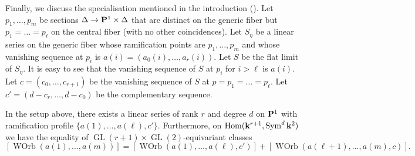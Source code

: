 \documentclass[11pt]{amsart}
\renewcommand {\P}{{\bf P}}
\providecommand{\GL}{\operatorname{GL}}
\providecommand{\Hom}{\operatorname{Hom}}
\providecommand{\Sym}{\operatorname{Sym}}
\DeclareMathOperator{\WOrb}{WOrb}
\begin{document}
Finally, we discuss the specialisation mentioned in the introduction ().
Let \(p_1, \dots, p_m\) be sections \(\Delta \to \P^1 \times \Delta\) that are distinct on the generic fiber but \(p_1 = \dots = p_\ell\) on the central fiber (with no other coincidences).
Let \(S_\eta\) be a linear series on the generic fiber whose ramification points are \(p_1, \dots, p_m\) and whose vanishing sequence at \(p_i\) is \(a(i) = (a_0(i),\dots,a_r(i))\).
Let \(S\) be the flat limit of \(S_\eta\).
It is easy to see that the vanishing sequence of \(S\) at \(p_i\) for \(i > \ell\) is \(a(i)\).
Let \(c = (c_0, \dots, c_{r+1})\) be the vanishing sequence of \(S\) at \(p = p_1 = \dots = p_\ell\).
Let \(c' = (d-c_r, \dots, d-c_0)\) be the complementary sequence.
\begin{proposition}\label{prop:introspec}
  In the setup above, there exists a linear series of rank \(r\) and degree \(d\) on \(\P^1\) with ramification profile \(\{a(1), \dots, a(\ell), c'\}\).
  Furthermore, on \(\Hom(\k^{r+1}, \Sym^d\k^2)\) we have the equality of \(\GL(r+1) \times \GL(2)\)-equivariant classes
  \[ [\WOrb(a(1), \dots, a(m))] = [\WOrb(a(1), \dots, a(\ell), c')] + [\WOrb(a(\ell+1), \dots, a(m), c)].\]
\end{proposition}
\end{document}
